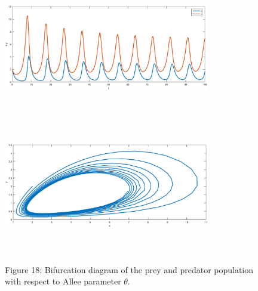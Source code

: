 \documentclass[a4paper, 10pt]{article}
\begin{document}
\begin{figure}[H]
	{\includegraphics[width=9cm, height=6cm]{24a.eps}}
	\endminipage\hfill
	{\includegraphics[width=9cm, height=6cm]{24b.eps}}
	\endminipage\hfill
	\begin{center} Figure 18: Bifurcation diagram of the prey and predator population with respect to Allee parameter $\theta.$  \end{center}
\end{figure}
\end{document}
